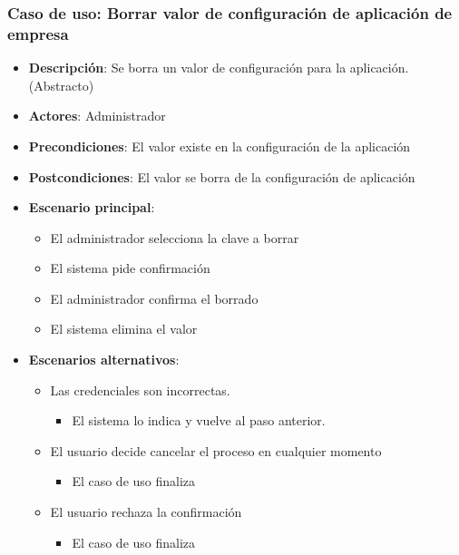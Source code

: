 \documentclass[12pt,a4paperpaper,]{report}
\providecommand{\tightlist}{%
  \setlength{\itemsep}{0pt}\setlength{\parskip}{0pt}}
\begin{document}
\subsubsection{Caso de uso: Borrar valor de configuración de aplicación
de
empresa}\label{caso-de-uso-borrar-valor-de-configuraciuxf3n-de-aplicaciuxf3n-de-empresa}

\begin{itemize}
\tightlist
\item
  \textbf{Descripción}: Se borra un valor de configuración para la
  aplicación. (Abstracto)
\item
  \textbf{Actores}: Administrador
\item
  \textbf{Precondiciones}: El valor existe en la configuración de la
  aplicación
\item
  \textbf{Postcondiciones}: El valor se borra de la configuración de
  aplicación
\item
  \textbf{Escenario principal}:

  \begin{itemize}
  \tightlist
  \item
    El administrador selecciona la clave a borrar
  \item
    El sistema pide confirmación
  \item
    El administrador confirma el borrado
  \item
    El sistema elimina el valor
  \end{itemize}
\item
  \textbf{Escenarios alternativos}:

  \begin{itemize}
  \tightlist
  \item
    Las credenciales son incorrectas.

    \begin{itemize}
    \tightlist
    \item
      El sistema lo indica y vuelve al paso anterior.
    \end{itemize}
  \item
    El usuario decide cancelar el proceso en cualquier momento

    \begin{itemize}
    \tightlist
    \item
      El caso de uso finaliza
    \end{itemize}
  \item
    El usuario rechaza la confirmación

    \begin{itemize}
    \tightlist
    \item
      El caso de uso finaliza
    \end{itemize}
  \end{itemize}
\end{itemize}
\end{document}
